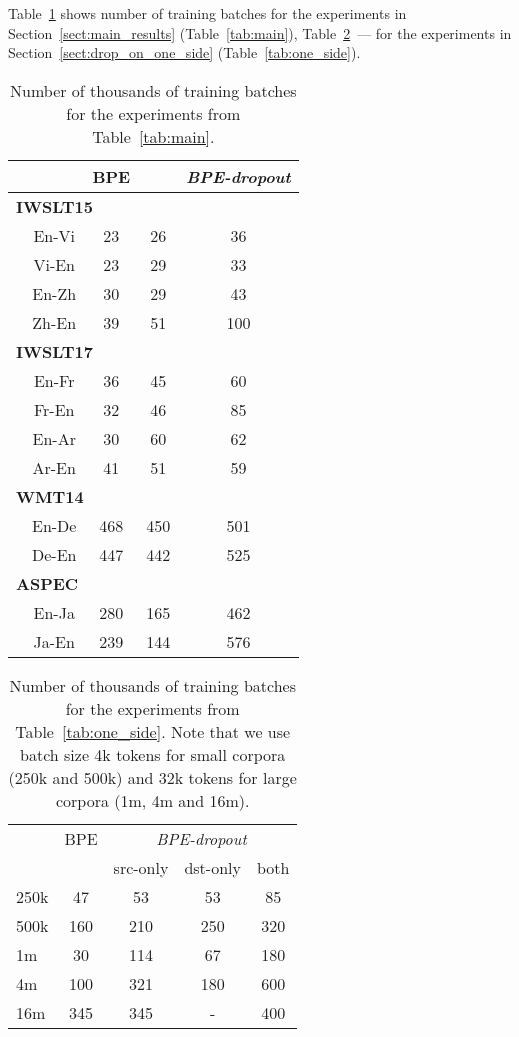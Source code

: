 \documentclass[11pt,a4paper]{article}
\begin{document}
Table~\ref{tab:num_steps_main} shows
number of training batches for the experiments in Section~\ref{sect:main_results} (Table~\ref{tab:main}), Table~\ref{tab:num_steps_one_side}~--- for the experiments in Section~\ref{sect:drop_on_one_side} (Table~\ref{tab:one_side}).

\begin{table}[h!]
\centering
\begin{tabular}{lcccc}
\toprule
& & BPE  & \citet{sentencepiece} & \textit{BPE-dropout}\\

\midrule
\multicolumn{5}{l}{\!\!\!\bf IWSLT15}\\
&\!\!\!\!\!\! En-Vi & 23 & 26 & 36 \\
&\!\!\!\!\!\! Vi-En & 23 & 29 & 33 \\
&\!\!\!\!\!\! En-Zh & 30 & 29  & 43 \\
&\!\!\!\!\!\! Zh-En & 39 & 51 & 100 \\
\midrule
\multicolumn{5}{l}{\!\!\!\bf IWSLT17}\\
&\!\!\!\!\!\! En-Fr & 36 & 45 & 60 \\
&\!\!\!\!\!\! Fr-En & 32 & 46 & 85 \\
&\!\!\!\!\!\! En-Ar & 30 & 60 & 62 \\
&\!\!\!\!\!\! Ar-En & 41 & 51 & 59 \\
\midrule
\multicolumn{5}{l}{\!\!\!\bf WMT14}\\
&\!\!\!\!\!\! En-De & 468 & 450 & 501  \\
&\!\!\!\!\!\! De-En & 447 & 442 & 525\\
\midrule
\multicolumn{5}{l}{\!\!\!\bf ASPEC}\\
&\!\!\!\!\!\! En-Ja & 280 & 165 & 462\\
&\!\!\!\!\!\! Ja-En & 239 & 144 & 576 \\

\bottomrule
\end{tabular}
\caption{Number of thousands of training batches for the experiments from Table~\ref{tab:main}.}
\label{tab:num_steps_main}
\end{table}


\begin{table}[h!]
\centering
\begin{tabular}{lcccc}
\toprule
 & BPE & \multicolumn{3}{c}{\textit{BPE-dropout}}\\
 & & src-only  & dst-only & both\\

\midrule
250k & 47 & 53 & 53 & 85 \\
500k & 160 & 210 & 250 & 320 \\
1m & 30 & 114 & 67 & 180 \\
4m & 100 & 321 & 180 & 600 \\
16m & 345 & 345 & - & 400 \\
\bottomrule
\end{tabular}
\caption{Number of thousands of training batches for the experiments from Table~\ref{tab:one_side}. Note that we use batch size 4k tokens for small corpora (250k and 500k) and 32k tokens for large corpora (1m, 4m and 16m).}
\label{tab:num_steps_one_side}
\end{table}
\end{document}
